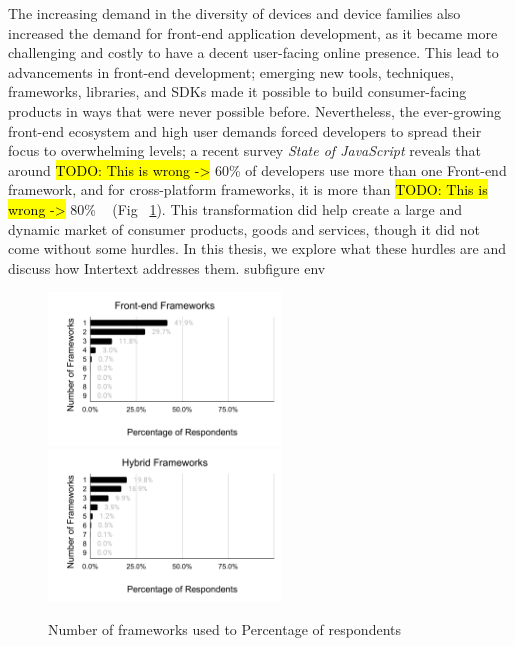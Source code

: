 The increasing demand in the diversity of devices and device families also increased the demand for front-end application development, as it became more challenging and costly to have a decent user-facing online presence. This lead to advancements in front-end development; emerging new tools, techniques, frameworks, libraries, and SDKs made it possible to build consumer-facing products in ways that were never possible before. Nevertheless, the ever-growing front-end ecosystem and high user demands forced developers to spread their focus to overwhelming levels; a recent survey \textit{State of JavaScript} reveals that around \hl{TODO: This is wrong ->} 60\% of developers use more than one Front-end framework, and for cross-platform frameworks, it is more than \hl{TODO: This is wrong ->} 80\% ~\cite{StateOfJs2020} (Fig ~\ref{fig:num_of_frameworks_used}). This transformation did help create a large and dynamic market of consumer products, goods and services, though it did not come without some hurdles. In this thesis, we explore what these hurdles are and discuss how Intertext addresses them.
subfigure env
\begin{figure}
  \centering
  \includegraphics[width=6.2cm]{images/sojs1.pdf}
  \,
  \includegraphics[width=6.2cm]{images/sojs2.pdf}
  \caption{Number of frameworks used to Percentage of respondents}%
  \label{fig:num_of_frameworks_used}%
\end{figure}





